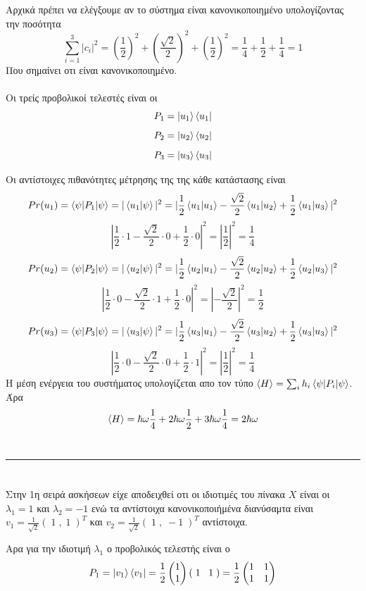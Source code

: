 \documentclass[12pt]{article}
\begin{document}
\section*{{}}
Aρχικά πρέπει να ελέγξουμε αν το σύστημα είναι κανονικοποιημένο υπολογίζοντας την ποσότητα
$$ \sum_{i=1}^{3}|c_i|^2 = (\frac{1}{2})^2+ (\frac{\sqrt{2}}{2})^2 + (\frac{1}{2})^2 = \frac{1}{4}+\frac{1}{2}+\frac{1}{4}=1$$
Που σημαίνει οτι είναι κανονικοποιημένο.\\ \\
Οι τρείς προβολικοί τελεστές είναι οι 
$$ P_1=\ket{u_1}\bra{u_1}$$
$$ P_2=\ket{u_2}\bra{u_2}$$
$$ P_3=\ket{u_3}\bra{u_3}$$

Οι αντίστοιχες πιθανότητες μέτρησης της της κάθε κατάστασης είναι 
$$Pr(u_1) = \braket{\psi|P_1|\psi} = | \braket{u_1|\psi}|^2 = | \frac{1}{2}\braket{u_1|u_1} -\frac{\sqrt{2}}{2}\braket{u_1|u_2}+\frac{1}{2}\braket{u_1|u_3}|^2$$
$$| \frac{1}{2}\cdot 1 -\frac{\sqrt{2}}{2}\cdot 0+\frac{1}{2}\cdot 0|^2 = | \frac{1}{2}|^2= \frac{1}{4}   $$
$$Pr(u_2) = \braket{\psi|P_2|\psi} = | \braket{u_2|\psi}|^2 = | \frac{1}{2}\braket{u_2|u_1} -\frac{\sqrt{2}}{2}\braket{u_2|u_2}+\frac{1}{2}\braket{u_2|u_3}|^2$$
$$| \frac{1}{2}\cdot 0 -\frac{\sqrt{2}}{2}\cdot 1+\frac{1}{2}\cdot 0|^2 = | -\frac{\sqrt{2}}{2}|^2= \frac{1}{2}   $$
$$Pr(u_3) = \braket{\psi|P_3|\psi} = | \braket{u_3|\psi}|^2 = | \frac{1}{2}\braket{u_3|u_1} -\frac{\sqrt{2}}{2}\braket{u_3|u_2}+\frac{1}{2}\braket{u_3|u_3}|^2$$
$$| \frac{1}{2}\cdot 0 -\frac{\sqrt{2}}{2}\cdot 0+\frac{1}{2}\cdot 1|^2 = | \frac{1}{2}|^2= \frac{1}{4}   $$
Η μέση ενέργεια του συστήματος υπολογίζεται απο τον τύπο $ \braket{H} = \sum_ih_i\braket{\psi|P_i|\psi}$. Άρα
$$\braket{H}=\hbar \omega \frac{1}{4} + 2\hbar \omega \frac{1}{2}+3\hbar \omega \frac{1}{4}=2\hbar \omega$$\\
\rule{\textwidth}{.5pt}




\section*{{}}
Στην 1η σειρά ασκήσεων είχε αποδειχθεί οτι οι ιδιοτιμές του πίνακα $X$ είναι οι $\lambda_1=1$ και $\lambda _2=-1$ ενώ τα αντίστοιχα κανονικοποιήμένα διανύσαμτα είναι
$v_1=\frac{1}{\sqrt{2}}(\;1\;,\;1\;)^T$ και $v_2=\frac{1}{\sqrt{2}}(\;1\;,\;-1\;)^T$ αντίστοιχα.

Αρα για την ιδιοτιμή $\lambda_1$ ο προβολικός τελεστής είναι ο 
$$ P_1 = \ket{v_1}\bra{v_1} = \frac{1}{2}\begin{pmatrix}
    1\\1
\end{pmatrix}(\;1\;\;\;1\;) = \frac{1}{2}\begin{pmatrix}
    1&1\\1&1
\end{pmatrix}$$
\end{document}
